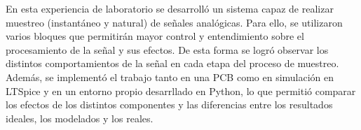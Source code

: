 En esta experiencia de laboratorio se desarrolló un sistema capaz de realizar
muestreo (instantáneo y natural) de señales analógicas. Para ello, se utilizaron varios bloques
que permitirán mayor control y entendimiento sobre el procesamiento de la señal y sus efectos.
De esta forma se logró observar los distintos comportamientos de la señal en cada etapa del
proceso de muestreo.
Además, se implementó el trabajo tanto en una PCB como en simulación en LTSpice y en un entorno
propio desarrllado en Python, lo que permitió comparar los efectos de los distintos componentes
y las diferencias entre los resultados ideales, los modelados y los reales.